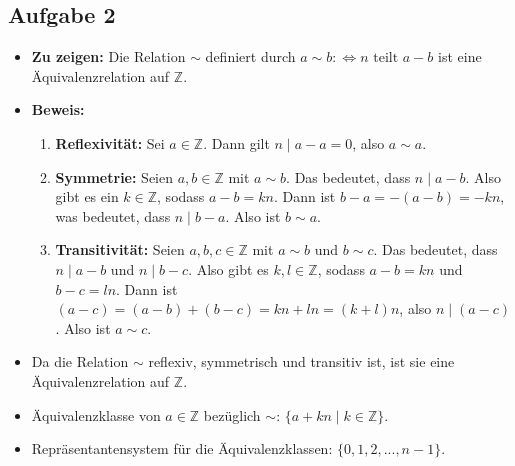 \documentclass[a4paper]{scrartcl}
\begin{document}
\subsection*{Aufgabe 2}

\begin{itemize}
  \item \textbf{Zu zeigen:} Die Relation $\sim$ definiert durch $a \sim b :\Leftrightarrow n \text{ teilt } a - b$ ist eine Äquivalenzrelation auf $\mathbb{Z}$.

  \item \textbf{Beweis:}
  \begin{enumerate}
    \item \textbf{Reflexivität:} Sei $a \in \mathbb{Z}$. Dann gilt $n \mid a - a = 0$, also $a \sim a$.
    
    \item \textbf{Symmetrie:} Seien $a, b \in \mathbb{Z}$ mit $a \sim b$. Das bedeutet, dass $n \mid a - b$. Also gibt es ein $k \in \mathbb{Z}$, sodass $a - b = kn$. Dann ist $b - a = -(a - b) = -kn$, was bedeutet, dass $n \mid b -
    a$. Also ist $b \sim a$.

    \item \textbf{Transitivität:} Seien $a, b, c \in \mathbb{Z}$ mit $a \sim b$ und $b \sim c$. Das bedeutet, dass $n \mid a - b$ und $n \mid b - c$. Also gibt es $k, l \in \mathbb{Z}$, sodass $a - b = kn
    $ und $b - c = ln$. Dann ist $(a - c) = (a - b) + (b - c) = kn + ln = (k + l)n$, also $n \mid (a - c)$. Also ist $a \sim c$.
  \end{enumerate} 

  \item Da die Relation $\sim$ reflexiv, symmetrisch und transitiv ist, ist sie eine Äquivalenzrelation auf $\mathbb{Z}$.
  
  \item Äquivalenzklasse von $a \in \mathbb{Z}$ bezüglich $\sim$: $\{a + kn \mid k \in \mathbb{Z}\}$.
  \item Repräsentantensystem für die Äquivalenzklassen: $\{0, 1, 2, ..., n-1\}$.
\end{itemize}
\end{document}
